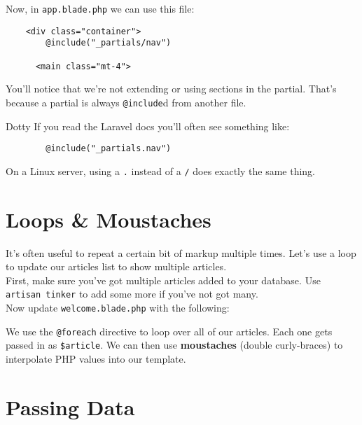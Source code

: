 
Now, in \texttt{app.blade.php} we can use this file:

\begin{verbatim}
    <div class="container">
        @include("_partials/nav")

      <main class="mt-4">
\end{verbatim}

You'll notice that we're not extending or using sections in the partial. That's because a partial is always \texttt{@include}d from another file.


\begin{infobox}{Dotty}
    If you read the Laravel docs you'll often see something like:

    \begin{verbatim}
        @include("_partials.nav")
    \end{verbatim}

    On a Linux server, using a \texttt{.} instead of a \texttt{/} does exactly the same thing.
\end{infobox}



\section{Loops \& Moustaches}

It's often useful to repeat a certain bit of markup multiple times. Let's use a loop to update our articles list to show multiple articles.
\\

First, make sure you've got multiple articles added to your database. Use \texttt{artisan tinker} to add some more if you've not got many.
\\

Now update \texttt{welcome.blade.php} with the following:


We use the \texttt{@foreach} directive to loop over all of our articles. Each one gets passed in as \texttt{\$article}. We can then use \textbf{moustaches} (double curly-braces) to interpolate PHP values into our template.

\section{Passing Data}

